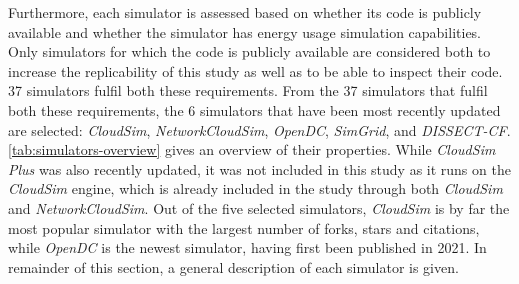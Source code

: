 Furthermore, each simulator is assessed based on whether its code is publicly available and whether the simulator has energy usage simulation capabilities. Only simulators for which the code is publicly available are considered both to increase the replicability of this study as well as to be able to inspect their code. 37 simulators fulfil both these requirements. From the 37 simulators that fulfil both these requirements, the 6 simulators that have been most recently updated are selected: \textit{CloudSim}, \textit{NetworkCloudSim}, \textit{OpenDC}, \textit{SimGrid}, and \textit{DISSECT-CF}. \autoref{tab:simulators-overview} gives an overview of their properties. While \textit{CloudSim Plus} was also recently updated, it was not included in this study as it runs on the \textit{CloudSim} engine, which is already included in the study through both \textit{CloudSim} and \textit{NetworkCloudSim}. Out of the five selected simulators, \textit{CloudSim} is by far the most popular simulator with the largest number of forks, stars and citations, while \textit{OpenDC} is the newest simulator, having first been published in 2021. In remainder of this section, a general description of each simulator is given.

